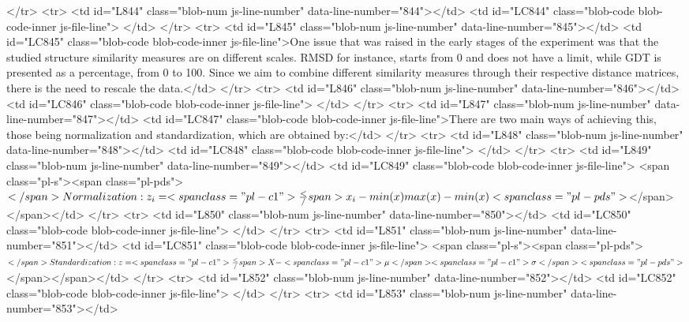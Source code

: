       </tr>
      <tr>
        <td id="L844" class="blob-num js-line-number" data-line-number="844"></td>
        <td id="LC844" class="blob-code blob-code-inner js-file-line">
</td>
      </tr>
      <tr>
        <td id="L845" class="blob-num js-line-number" data-line-number="845"></td>
        <td id="LC845" class="blob-code blob-code-inner js-file-line">One issue that was raised in the early stages of the experiment was that the studied structure similarity measures are on different scales. RMSD for instance, starts from 0 and does not have a limit, while GDT is presented as a percentage, from 0 to 100. Since we aim to combine different similarity measures through their respective distance matrices, there is the need to rescale the data.</td>
      </tr>
      <tr>
        <td id="L846" class="blob-num js-line-number" data-line-number="846"></td>
        <td id="LC846" class="blob-code blob-code-inner js-file-line">
</td>
      </tr>
      <tr>
        <td id="L847" class="blob-num js-line-number" data-line-number="847"></td>
        <td id="LC847" class="blob-code blob-code-inner js-file-line">There are two main ways of achieving this, those being normalization and standardization, which are obtained by:</td>
      </tr>
      <tr>
        <td id="L848" class="blob-num js-line-number" data-line-number="848"></td>
        <td id="LC848" class="blob-code blob-code-inner js-file-line">
</td>
      </tr>
      <tr>
        <td id="L849" class="blob-num js-line-number" data-line-number="849"></td>
        <td id="LC849" class="blob-code blob-code-inner js-file-line">	 <span class="pl-s"><span class="pl-pds">$</span>Normalization: z_i = <span class="pl-c1">\frac</span>{x_i - min(x)}{max(x)-min(x)}<span class="pl-pds">$</span></span></td>
      </tr>
      <tr>
        <td id="L850" class="blob-num js-line-number" data-line-number="850"></td>
        <td id="LC850" class="blob-code blob-code-inner js-file-line">
</td>
      </tr>
      <tr>
        <td id="L851" class="blob-num js-line-number" data-line-number="851"></td>
        <td id="LC851" class="blob-code blob-code-inner js-file-line">	 <span class="pl-s"><span class="pl-pds">$</span>Standardization: z = <span class="pl-c1">\frac</span>{X - <span class="pl-c1">\mu</span>}{<span class="pl-c1">\sigma</span>}<span class="pl-pds">$</span></span></td>
      </tr>
      <tr>
        <td id="L852" class="blob-num js-line-number" data-line-number="852"></td>
        <td id="LC852" class="blob-code blob-code-inner js-file-line">
</td>
      </tr>
      <tr>
        <td id="L853" class="blob-num js-line-number" data-line-number="853"></td>
